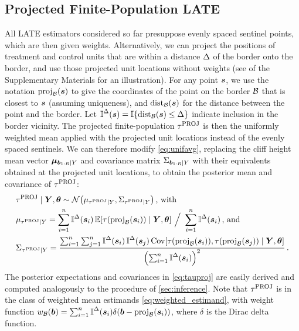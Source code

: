 \subsection{Projected Finite-Population LATE}
All LATE estimators considered so far presuppose evenly spaced sentinel points, which are then given weights.
Alternatively, we can project the positions of treatment and control units that are within a distance \(\Delta\) of the border onto the border, and use those projected unit locations without weights (see  of the Supplementary Materials for an illustration).
For any point \(\bm{s}\), we use the notation \(\proj_{\border}\del{\svec}\) to give the coordinates of the point on the border \(\mathcal{B}\) that is closest to \(\bm{s}\) (assuming uniqueness), and \(\dist_{\border}\del{\svec}\) for the distance between the point and the border.
Let \(\vicinity{\svec} = \allowbreak \Ind\cbr{\dist_{\border}\del{\svec} \le \buffer} \) indicate inclusion in the border vicinity.
The projected finite-population \(\tau^{\mathrm{PROJ}}\) is then the uniformly weighted mean applied with the projected unit locations instead of the evenly spaced sentinels.
We can therefore modify \autoref{eq:unifavg}, replacing the cliff height mean vector \(\bm{\mu}_{\bm{b}_{1:R} \mid Y}\)
and covariance matrix \(\Sigma_{\bm{b}_{1:R} \mid Y}\)
with their equivalents obtained at the projected unit locations,
to obtain the posterior mean and covariance of \(\tau^{\mathrm{PROJ}}\):
\begin{equation}\begin{split}
    &\tauproj \mid \Yvec, \hyperparam \sim \normal\del{\mu_{\tauproj \mid Y}, \Sigma_{\tauproj \mid Y}}\,\text{, with} \\
    &\mu_{\tauproj \mid Y} = 
    \sum_{i=1}^{n}
    \vicinity{\svec_i}
    \E\sbr{
        \tau\del{
            \proj_{\border}\del{\svec_i}
        }
        \mid \Yvec, \hyperparam
    } 
    \ 
    \Big/
    \ 
        \sum_{i=1}^{n}
        \vicinity{\svec_i}
    \,\text{, and}\\
    &\Sigma_{\tauproj \mid Y} = 
    \frac{
        \sum_{i=1}^{n} 
        \sum_{j=1}^{n} 
        \vicinity{\svec_i}
        \vicinity{\svec_j}
        \cov\sbr{
            \tau\del{
                \proj_{\border}\del{\svec_i}
            },
            \tau\del{
                \proj_{\border}\del{\svec_j}
            }
            \mid \Yvec, \hyperparam
        }
    }{
        \del{
            \sum_{i=1}^{n}
            \vicinity{\svec_i}
        }^2
    }
    \,.
\end{split}
\label{eq:tauproj}
\end{equation}
The posterior expectations and covariances in \autoref{eq:tauproj} are easily derived and computed analogously to the procedure of \autoref{sec:inference}.
Note that \(\tau^{\mathrm{PROJ}}\) is in the class of weighted mean estimands \autoref{eq:weighted_estimand},
with weight function \(\weightb(\sentinel) = \sum_{i=1}^{n} \vicinity{\svec_i} \delta\del{ \sentinel - \proj_\border(\svec_i)}\), where \(\delta\) is the Dirac delta function.

